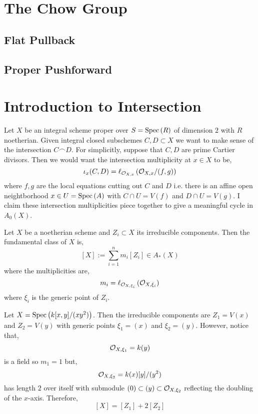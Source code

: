 \documentclass[12pt]{article}
\begin{document}
\section{The Chow Group}

\subsection{Flat Pullback}


\subsection{Proper Pushforward}

\section{Introduction to Intersection}

Let $X$ be an integral scheme proper over $S = \mathrm{Spec}\left( R \right)$ of dimension $2$ with $R$ noetherian. Given integral closed subschemes $C, D \subset X$ we want to make sense of the intersection $C \frown D$. For simplicitly, suppose that $C, D$ are prime Cartier divisors. Then we would want the intersection multiplicity at $x \in X$ to be,
\[ \iota_x(C, D) = \ell_{\mathcal{O}_{X, x}} \left( \mathcal{O}_{X, x}/(f, g) \right) \]
where $f, g$ are the local equations cutting out $C$ and $D$ i.e. there is an affine open neightborhood $x \in U = \mathrm{Spec}\left( A \right)$ with $C \cap U = V(f)$ and $D \cap U = V(g)$. I claim these intersection multiplicities piece together to give a meaningful cycle in $A_0(X)$. 

\begin{defn}
Let $X$ be a noetherian scheme and $Z_i \subset X$ its irreducible components. Then the fundamental class of $X$ is,
\[ [X] := \sum_{i = 1}^n m_i [Z_i] \in A_*(X) \]
where the multiplicities are,
\[ m_i = \ell_{\mathcal{O}_{X, \xi_i}}\left( \mathcal{O}_{X, \xi_i} \right) \] 
where $\xi_i$ is the generic point of $Z_i$.
\end{defn}

\begin{example}
Let $X = \mathrm{Spec}\left( k[x,y]/(xy^2) \right)$. Then the irreducible components are $Z_1 = V(x)$ and $Z_2 = V(y)$ with generic points $\xi_1 = (x)$ and $\xi_2 = (y)$. However, notice that,
\[ \mathcal{O}_{X, \xi_1} = k(y) \]
is a field so $m_1 = 1$ but,
\[ \mathcal{O}_{X, \xi_2} = k(x)[y]/(y^2) \]
has length $2$ over itself with submodule $(0) \subset (y) \subset \mathcal{O}_{X, \xi_2}$ reflecting the doubling of the $x$-axis. Therefore,
\[ [X] = [Z_1] + 2 [Z_2] \]
\end{example}
\end{document}

